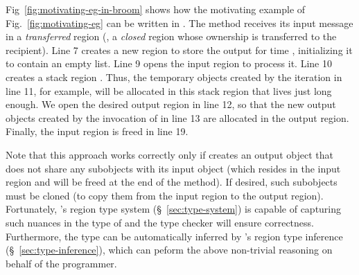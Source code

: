 Fig~\ref{fig:motivating-eg-in-broom} shows how the motivating example
of Fig.~\ref{fig:motivating-eg} can be written in \name.
The  method receives its input message in a \emph{transferred}
region (\ie, a \emph{closed} region whose ownership is transferred to the
recipient).
Line 7 creates a new region to store the output for time ,
initializing it to contain an empty list.
Line 9 opens the input region to process it.
Line 10 creates a stack region .
Thus, the temporary objects created by the iteration in line 11,
for example, will be allocated in this stack region that lives just
long enough.
We open the desired output region in line 12, so that the new output
objects created by the invocation of  in line 13
are allocated in the output region.
Finally, the input region is freed in line 19.

Note that this approach works correctly only if 
creates an output object that does not share any subobjects with its input
object (which resides in the input region and will be freed at the end of
the method).
If desired, such subobjects must be cloned (to copy them from the input
region to the output region).
Fortunately, \name's region type system (\S~\ref{sec:type-system}) is
capable of capturing such nuances in the type of 
and the type checker will ensure correctness.
Furthermore, the type can be automatically inferred by \name's region type
inference (\S~\ref{sec:type-inference}), which can peform the above
non-trivial reasoning on behalf of the programmer.
